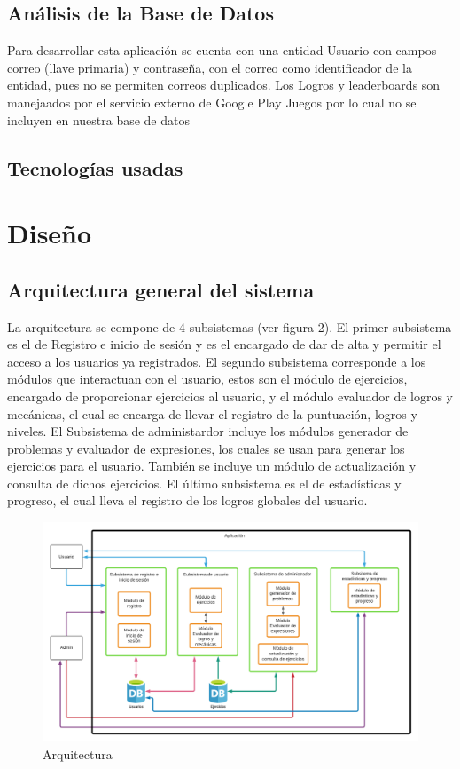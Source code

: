 \documentclass{article}
\begin{document}
\subsection{Análisis de la Base de Datos}%
Para desarrollar esta aplicación se cuenta con una entidad Usuario con campos correo (llave primaria) y contraseña, con el correo como identificador de la entidad, pues no se permiten correos duplicados. Los Logros y leaderboards son manejaados por el servicio externo de Google Play Juegos por lo cual no se incluyen en nuestra base de datos
\subsection{Tecnologías usadas}
\pagebreak
\section{Diseño}
\subsection{Arquitectura general del sistema}%
La arquitectura se compone de 4 subsistemas (ver figura 2).  El primer subsistema es el de Registro e inicio de sesión y es el encargado de dar de alta y permitir el acceso a los usuarios ya registrados. El segundo subsistema corresponde a los módulos que interactuan con el usuario, estos son el módulo de ejercicios, encargado de proporcionar ejercicios al usuario, y el módulo evaluador de logros y mecánicas, el cual se encarga de llevar el registro de la puntuación, logros y niveles. El Subsistema de administardor incluye los módulos generador de problemas y evaluador de expresiones, los cuales se usan para generar los ejercicios para el usuario. También se incluye un módulo de actualización y consulta de dichos ejercicios. El último subsistema es el de estadísticas y progreso, el cual lleva el registro de los logros globales del usuario.  
\begin{figure}[H]
    \centering
    \includegraphics[scale=0.65]{imgs/Arquitectura}
    \caption{Arquitectura}
\end{figure}
\end{document}
